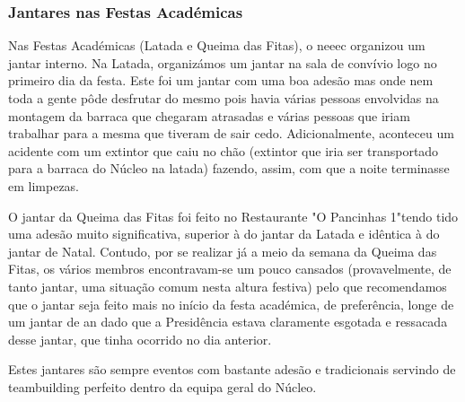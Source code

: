 
\subsubsection{Jantares nas Festas Académicas}

Nas Festas Académicas (Latada e Queima das Fitas), o \acrshort{neeec} organizou um jantar interno. Na Latada, organizámos um jantar na sala de convívio logo no primeiro dia da festa. Este foi um jantar com uma boa adesão mas onde nem toda a gente pôde desfrutar do mesmo pois havia várias pessoas envolvidas na montagem da barraca que chegaram atrasadas e várias pessoas que iriam trabalhar para a mesma que tiveram de sair cedo. Adicionalmente, aconteceu um acidente com um extintor que caiu no chão (extintor que iria ser transportado para a barraca do Núcleo na latada) fazendo, assim, com que a noite terminasse em limpezas.

O jantar da Queima das Fitas foi feito no Restaurante "O Pancinhas 1"\space tendo tido uma adesão muito significativa, superior à do jantar da Latada e idêntica à do jantar de Natal. Contudo, por se realizar já a meio da semana da Queima das Fitas, os vários membros encontravam-se um pouco cansados (provavelmente, de tanto jantar, uma situação comum nesta altura festiva) pelo que recomendamos que o jantar seja feito mais no início da festa académica, de preferência, longe de um jantar de \acrlong{an} dado que a Presidência estava claramente esgotada e ressacada desse jantar, que tinha ocorrido no dia anterior.

Estes jantares são sempre eventos com bastante adesão e tradicionais servindo de teambuilding perfeito dentro da equipa geral do Núcleo.